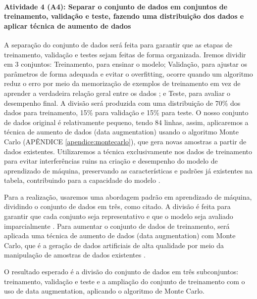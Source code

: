 \paragraph{\textbf{Atividade 4 (A4):} Separar o conjunto de dados em conjuntos de treinamento, validação e teste, fazendo uma distribuição dos dados e aplicar técnica de aumento de dados}
   
A separação do conjunto de dados será feita para garantir que as etapas de treinamento, validação e testes sejam feitas de forma organizada. Iremos dividir em 3 conjuntos: Treinamento, para ensinar o modelo; Validação, para ajustar os parâmetros de forma adequada e evitar o overfitting, ocorre quando um algoritmo reduz o erro por meio da memorização de exemplos de treinamento em vez de aprender a verdadeira relação geral entre os dados \cite{bashir2020}; e Teste, para avaliar o desempenho final. A divisão será produzida com uma distribuição de 70\% dos dados para treinamento, 15\% para validação e 15\% para teste. O nosso conjunto de dados original é relativamente pequeno, tendo 84 linhas, assim, aplicaremos a técnica de aumento de dados (data augmentation) usando o algoritmo Monte Carlo (APÊNDICE \ref{apendice:montecarlo}), que gera novas amostras a partir de dados existentes. Utilizaremos a técnica exclusivamente nos dados de treinamento para evitar interferências ruins na criação e desempenho do modelo de aprendizado de máquina, preservando as características e padrões já existentes na tabela, contribuindo para a capacidade do modelo \cite{kiar2021}. 

Para a realização, usaremos uma abordagem padrão em aprendizado de máquina, dividindo o conjunto de dados em três, como citado. A divisão é feita para garantir que cada conjunto seja representativo e que o modelo seja avaliado imparcialmente \cite{bashir2020}. Para aumentar o conjunto de dados de treinamento, será aplicada uma técnica de aumento de dados (data augmentation) com Monte Carlo, que é a geração de dados artificiais de alta qualidade por meio da manipulação de amostras de dados existentes \cite{wang2024}. 

O resultado esperado é a divisão do conjunto de dados em três subconjuntos: treinamento, validação e teste e a ampliação do conjunto de treinamento com o uso de data augmentation, aplicando o algoritmo de Monte Carlo. 

